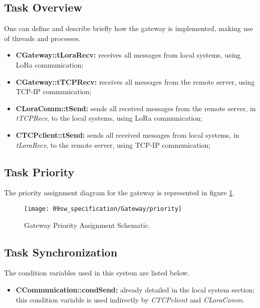 \subsection{Task Overview}
One can define and describe briefly how the gateway is implemented, making use of threads and processes.

\begin{itemize}
	\item \textbf{CGateway::tLoraRecv:} receives all messages from local systems, using LoRa communication;
	\item \textbf{CGateway::tTCPRecv:} receives all messages from the remote server, using TCP-IP communication;	
	\item \textbf{CLoraComm::tSend:} sends all received messages from the remote server, in \textit{tTCPRecv}, to the local systems, using LoRa communication; 
	\item \textbf{CTCPclient::tSend:} sends all received messages from local systems, in \textit{tLoraRecv}, to the remote server, using TCP-IP communication;
\end{itemize}

\subsection{Task Priority}
The priority assignment diagram for the gateway is represented in figure \ref{fig:gwt_priority}.

\begin{figure}[H]
	\centering
	\texttt{[image: 09sw\_specification/Gateway/priority]}
	\caption{Gateway Priority Assignment Schematic.}
	\label{fig:gwt_priority}
\end{figure}

\subsection{Task Synchronization}


The condition variables used in this system are listed below.

\begin{itemize}
	\item \textbf{CCommunication::condSend:} already detailed in the local system section; this condition variable is used indirectly by \textit{CTCPclient} and \textit{CLoraComm}.
\end{itemize}

